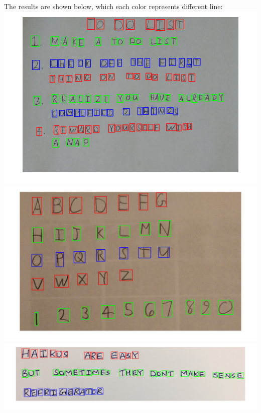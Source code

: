 \documentclass[12pt,letterpaper,boxed]{hmcpset}
\begin{document}
\begin{solution}
The results are shown below, which each color represents different line:\\
\includegraphics[width=\textwidth]{4_3_4.png}\\
\includegraphics[width=\textwidth]{4_3_3.png}\\
\includegraphics[width=\textwidth]{4_3_2.png}\\

\end{solution}
\end{document}
